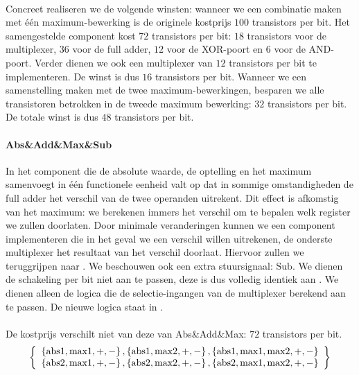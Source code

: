 \paragraph{}
Concreet realiseren we de volgende winsten: wanneer we een combinatie maken met \'e\'en maximum-bewerking is de originele kostprijs $100$ transistors per bit. Het samengestelde component kost $72$ transistors per bit: $18$ transistors voor de multiplexer, $36$ voor de full adder, $12$ voor de XOR-poort en $6$ voor de AND-poort. Verder dienen we ook een multiplexer van $12$ transistors per bit te implementeren. De winst is dus $16$ transistors per bit. Wanneer we een samenstelling maken met de twee maximum-bewerkingen, besparen we alle transistoren betrokken in de tweede maximum bewerking: $32$ transistors per bit. De totale winst is dus $48$ transistors per bit.
\paragraph{Abs\&Add\&Max\&Sub}In het component die de absolute waarde, de optelling en het maximum samenvoegt in \'e\'en functionele eenheid valt op dat in sommige omstandigheden de full adder het verschil van de twee operanden uitrekent. Dit effect is afkomstig van het maximum: we berekenen immers het verschil om te bepalen welk register we zullen doorlaten. Door minimale veranderingen kunnen we een component implementeren die in het geval we een verschil willen uitrekenen, de onderste multiplexer het resultaat van het verschil doorlaat. Hiervoor zullen we teruggrijpen naar . We beschouwen ook een extra stuursignaal: $\mbox{Sub}$. We dienen de schakeling per bit niet aan te passen, deze is dus volledig identiek aan . We dienen alleen de logica die de selectie-ingangen van de multiplexer berekend aan te passen. De nieuwe logica staat in .
\paragraph{}
De kostprijs verschilt niet van deze van \mbox{Abs\&Add\&Max}: $72$ transistors per bit.
\begin{equation}
\left\{ \begin{array}{c} \left\{ \mbox{abs1},\mbox{max1},+,- \right\},\left\{ \mbox{abs1},\mbox{max2},+,- \right\},\left\{ \mbox{abs1},\mbox{max1},\mbox{max2},+,- \right\}\\\left\{ \mbox{abs2},\mbox{max1},+,- \right\},\left\{ \mbox{abs2},\mbox{max2},+,- \right\},\left\{ \mbox{abs2},\mbox{max1},\mbox{max2},+,- \right\} \end{array} \right\}
\end{equation}
